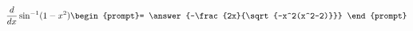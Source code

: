 \documentclass{ximera}
\author{Steven Gubkin}
\begin{document}
\begin{exercise}

\[
\frac{d}{dx} \sin^{-1}(1-x^2) \begin{prompt}= \answer{-\frac{2x}{\sqrt{-x^2(x^2-2)}}}
\end{prompt}
\]

\end{exercise}
\end{document}
